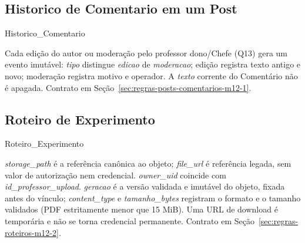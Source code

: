 \subsection{Historico de Comentario em um Post}
\begin{entidade}{Historico\_Comentario}
\end{entidade}
\begin{explicacao}
Cada edição do autor ou moderação pelo professor dono/Chefe (Q13) gera um
evento imutável: \textit{tipo} distingue \textit{edicao} de \textit{moderacao};
edição registra texto antigo e novo; moderação registra motivo e operador. A
\textit{texto} corrente do Comentário não é apagada. Contrato em
Seção~\ref{sec:regras-posts-comentarios-m12-1}.
\end{explicacao}

\subsection{Roteiro de Experimento}
\begin{entidade}{Roteiro\_Experimento}
\end{entidade}
\begin{explicacao}
\textit{storage\_path} é a referência canônica ao objeto; \textit{file\_url} é
referência legada, sem valor de autorização nem credencial. \textit{owner\_uid}
coincide com \textit{id\_professor\_upload}. \textit{geracao} é a versão
validada e imutável do objeto, fixada antes do vínculo; \textit{content\_type} e
\textit{tamanho\_bytes} registram o formato e o tamanho validados (PDF
estritamente menor que 15 MiB). Uma URL de download é temporária e não se torna
credencial permanente. Contrato em
Seção~\ref{sec:regras-roteiros-m12-2}.
\end{explicacao}


